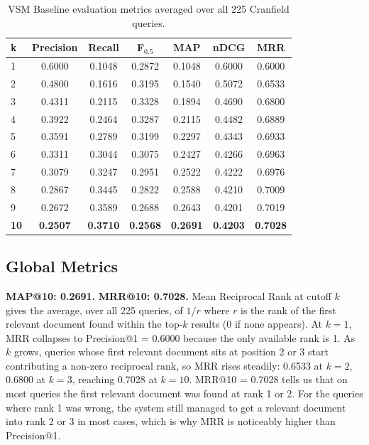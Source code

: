\documentclass{svproc}
\begin{document}
    \begin{table}[H]
    \centering
    \renewcommand{\arraystretch}{1.25}
    \begin{tabular}{lcccccc}
    \toprule
    \textbf{k} & \textbf{Precision} & \textbf{Recall} & \textbf{F$_{0.5}$} & \textbf{MAP} & \textbf{nDCG} & \textbf{MRR} \\
    \midrule
    1  & 0.6000 & 0.1048 & 0.2872 & 0.1048 & 0.6000 & 0.6000 \\
    2  & 0.4800 & 0.1616 & 0.3195 & 0.1540 & 0.5072 & 0.6533 \\
    3  & 0.4311 & 0.2115 & 0.3328 & 0.1894 & 0.4690 & 0.6800 \\
    4  & 0.3922 & 0.2464 & 0.3287 & 0.2115 & 0.4482 & 0.6889 \\
    5  & 0.3591 & 0.2789 & 0.3199 & 0.2297 & 0.4343 & 0.6933 \\
    6  & 0.3311 & 0.3044 & 0.3075 & 0.2427 & 0.4266 & 0.6963 \\
    7  & 0.3079 & 0.3247 & 0.2951 & 0.2522 & 0.4222 & 0.6976 \\
    8  & 0.2867 & 0.3445 & 0.2822 & 0.2588 & 0.4210 & 0.7009 \\
    9  & 0.2672 & 0.3589 & 0.2688 & 0.2643 & 0.4201 & 0.7019 \\
    \textbf{10} & \textbf{0.2507} & \textbf{0.3710} & \textbf{0.2568} & \textbf{0.2691} & \textbf{0.4203} & \textbf{0.7028} \\
    \bottomrule
    \end{tabular}
    \caption{VSM Baseline evaluation metrics averaged over all 225 Cranfield queries.}
    \label{tab:baseline}
    \end{table}

    \subsection{Global Metrics}

    \textbf{MAP@10: 0.2691.} \quad \textbf{MRR@10: 0.7028.}
    Mean Reciprocal Rank at cutoff $k$ gives the average, over all 225 queries, of $1/r$ where $r$ is the rank of the first relevant document found within the top-$k$ results (0 if none appears). At $k{=}1$, MRR collapses to Precision@1 = 0.6000 because the only available rank is 1. As $k$ grows, queries whose first relevant document sits at position 2 or 3 start contributing a non-zero reciprocal rank, so MRR rises steadily: 0.6533 at $k{=}2$, 0.6800 at $k{=}3$, reaching 0.7028 at $k{=}10$. MRR@10 = 0.7028 tells us that on most queries the first relevant document was found at rank 1 or 2. For the queries where rank 1 was wrong, the system still managed to get a relevant document into rank 2 or 3 in most cases, which is why MRR is noticeably higher than Precision@1.
\end{document}
